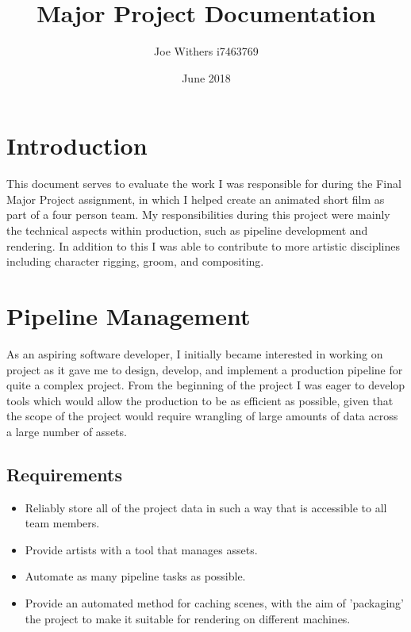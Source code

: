 \documentclass[11pt]{article}
\title{\textbf{Major Project Documentation}}
\author{Joe Withers i7463769}
\date{June 2018}
\begin{document}
\maketitle

\newpage

\tableofcontents

\newpage

\section{Introduction}

This document serves to evaluate the work I was responsible for during the Final Major Project assignment, in which I helped create an animated short film as part of a four person team. My responsibilities during this project were mainly the technical aspects within production, such as pipeline development and rendering. In addition to this I was able to contribute to more artistic disciplines including character rigging, groom, and compositing.

\section{Pipeline Management}

As an aspiring software developer, I initially became interested in working on project as it gave me to design, develop, and implement a production pipeline for quite a complex project. From the beginning of the project I was eager to develop tools which would allow the production to be as efficient as possible, given that the scope of the project would require wrangling of large amounts of data across a large number of assets.

\subsection{Requirements}

\begin{itemize}

\item Reliably store all of the project data in such a way that is accessible to all team members.

\item Provide artists with a tool that manages assets.

\item Automate as many pipeline tasks as possible.

\item Provide an automated method for caching scenes, with the aim of 'packaging' the project to make it suitable for rendering on different machines.

\end{itemize}
\end{document}
